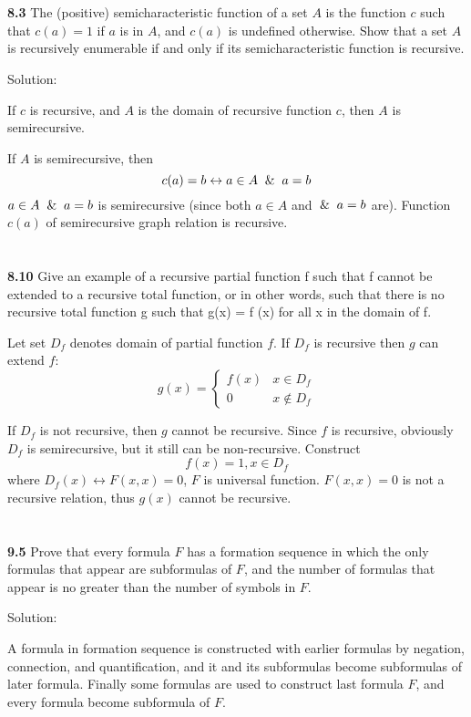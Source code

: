 \documentclass{ctexart}
\begin{document}
\section*{}
\textbf{8.3} The (positive) semicharacteristic function of a set $A$ is the function $c$ such
that $c(a) = 1$ if $a$ is in $A$, and $c(a)$ is undefined otherwise. Show that a set $A$ is
recursively enumerable if and only if its semicharacteristic function is recursive.

Solution:

If $c$ is recursive, and $A$ is the domain of recursive function $c$, then $A$ is semirecursive.

If $A$ is semirecursive, then
$$
c(a) = b \leftrightarrow a \in A \And a = b
$$
$a \in A \And a = b$ is semirecursive (since both $a \in A$ and $\And a = b$ are). Function $c(a)$
of semirecursive graph relation is recursive.

\section*{}
\textbf{8.10} Give an example of a recursive partial function f such that f
cannot be extended to a recursive total function, or in other words, such that there is no
recursive total function g such that g(x) = f (x) for all x in the domain of f.

Let set $D_f$ denotes domain of partial function $f$. If $D_f$ is recursive
then $g$ can extend $f$:
$$
g(x) = \begin{cases}
	f(x) & x \in D_f \\
	0 & x \not\in D_f
\end{cases}
$$

If $D_f$ is not recursive, then $g$ cannot be recursive. Since $f$ is recursive,
obviously $D_f$ is semirecursive, but it still can be non-recursive. Construct
$$
f(x) = 1, x \in D_f
$$
where $D_f(x) \leftrightarrow F(x, x) = 0$, $F$ is universal function. $F(x, x) = 0$ is not a
recursive relation, thus $g(x)$ cannot be recursive.

\section*{}
\textbf{9.5} Prove that every formula $F$ has a formation sequence in which the only formulas
that appear are subformulas of $F$, and the number of formulas that appear is no greater than
the number of symbols in $F$.

Solution:

A formula in formation sequence is constructed with earlier formulas by negation, connection, and
quantification, and it and its subformulas become subformulas of later formula. Finally some
formulas are used to construct last formula $F$, and every formula become subformula of $F$.
\end{document}
